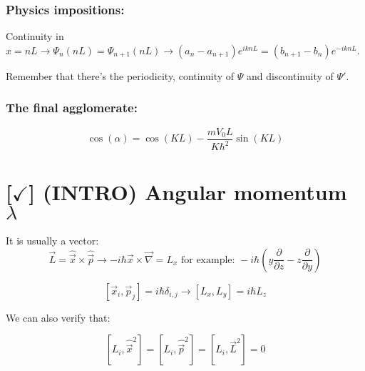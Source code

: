 \subsubsection{Physics impositions: } Continuity in $x = nL \rightarrow \Psi_n(nL) = \Psi_{n+1}(nL) \rightarrow (a_n - a_{n+1})e^{iknL} = (b_{n+1} -b_n)e^{-iknL}$.

\vspace{10pt}

\noindent Remember that there's the periodicity, continuity of $\Psi$ and discontinuity of $\Psi'$.

\subsubsection{The final agglomerate:}

$$ \cos(\alpha) = \cos(KL) - \frac{mV_0L}{K\hbar^2} \sin(KL) $$

\section{[$\checkmark$] (INTRO) Angular momentum $\lambda$}

It is usually a vector: $$\vec{L} = \hat{\vec{x}} \times \hat{\vec{p}} \rightarrow -i\hbar \vec{x} \times  \vec{\nabla} = L_x \text{ for example: } -i\hbar \left( y\frac{\partial}{\partial z} - z\frac{\partial}{\partial y} \right) $$

$$ \left[ \vec{x}_i, \vec{p}_j \right] = i\hbar\delta_{i,j} \rightarrow \left[ L_x, L_y \right] = i\hbar L_z $$

\noindent We can also verify that:

$$\left[ L_i, \hat{\vec{x}}^2 \right] = \left[ L_i, \hat{\vec{p}}^2 \right] = \left[ L_i, \vec{L}^2 \right] = 0$$